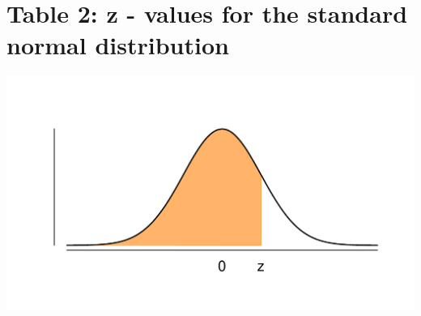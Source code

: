 \section{Table 2: z - values for the standard normal distribution}
\label{table2}

\vspace*{-30pt}
\begin{minipage}{0.6\textwidth}
\hfill
\end{minipage}
\begin{minipage}{0.4\textwidth}
\includegraphics[width=\textwidth]{Files/Images/Normal.pdf}
\end{minipage}

